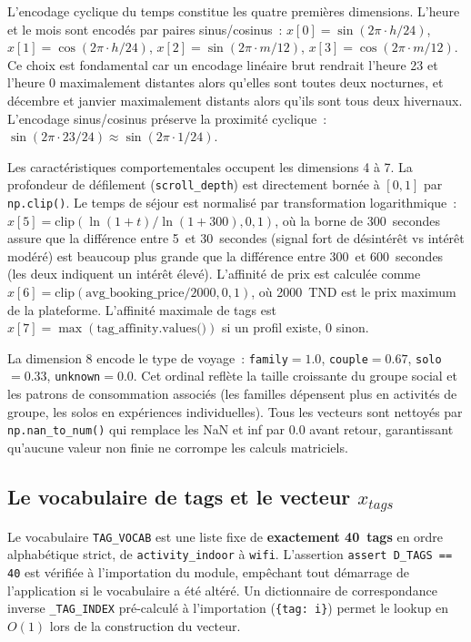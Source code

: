 L'encodage cyclique du temps constitue les quatre premières dimensions. L'heure et le mois
sont encodés par paires sinus/cosinus~: $x[0] = \sin(2\pi \cdot h/24)$,
$x[1] = \cos(2\pi \cdot h/24)$, $x[2] = \sin(2\pi \cdot m/12)$,
$x[3] = \cos(2\pi \cdot m/12)$. Ce choix est fondamental car un encodage linéaire brut
rendrait l'heure 23 et l'heure 0 maximalement distantes alors qu'elles sont toutes deux
\og{}nocturnes\fg{}, et décembre et janvier maximalement distants alors qu'ils sont tous deux
\og{}hivernaux\fg{}. L'encodage sinus/cosinus préserve la proximité cyclique~:
$\sin(2\pi \cdot 23/24) \approx \sin(2\pi \cdot 1/24)$.

Les caractéristiques comportementales occupent les dimensions 4 à 7. La profondeur de
défilement (\texttt{scroll\_depth}) est directement bornée à $[0, 1]$ par
\texttt{np.clip()}. Le temps de séjour est normalisé par transformation logarithmique~:
$x[5] = \text{clip}(\ln(1 + t) / \ln(1 + 300), 0, 1)$, où la borne de 300~secondes
assure que la différence entre 5~et 30~secondes (signal fort de désintérêt vs intérêt modéré)
est beaucoup plus grande que la différence entre 300~et 600~secondes (les deux indiquent un
intérêt élevé). L'affinité de prix est calculée comme
$x[6] = \text{clip}(\text{avg\_booking\_price}/2000, 0, 1)$, où 2000~TND est le prix maximum
de la plateforme. L'affinité maximale de tags est
$x[7] = \max(\text{tag\_affinity.values()})$ si un profil existe, 0 sinon.

La dimension 8 encode le type de voyage~: \texttt{family}$=1.0$, \texttt{couple}$=0.67$,
\texttt{solo}$=0.33$, \texttt{unknown}$=0.0$. Cet ordinal reflète la taille croissante du
groupe social et les patrons de consommation associés (les familles dépensent plus en activités
de groupe, les solos en expériences individuelles). Tous les vecteurs sont nettoyés par
\texttt{np.nan\_to\_num()} qui remplace les NaN et inf par 0.0 avant retour, garantissant
qu'aucune valeur non finie ne corrompe les calculs matriciels.


\subsection{Le vocabulaire de tags et le vecteur $x_{tags}$}

Le vocabulaire \texttt{TAG\_VOCAB} est une liste fixe de \textbf{exactement 40~tags} en ordre
alphabétique strict, de \texttt{activity\_indoor} à \texttt{wifi}. L'assertion
\texttt{assert D\_TAGS == 40} est vérifiée à l'importation du module, empêchant tout
démarrage de l'application si le vocabulaire a été altéré. Un dictionnaire de correspondance
inverse \texttt{\_TAG\_INDEX} pré-calculé à l'importation (\texttt{\{tag: i\}}) permet le
lookup en $O(1)$ lors de la construction du vecteur.

